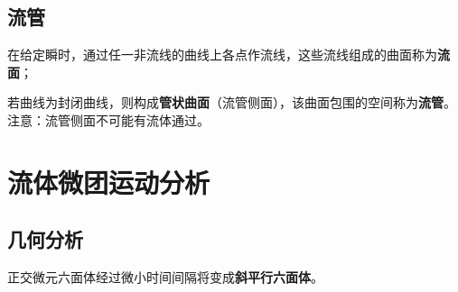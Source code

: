 \subsection{流管}

在给定瞬时，通过任一非流线的曲线上各点作流线，这些流线组成的曲面称为\textbf{流面}；

若曲线为封闭曲线，则构成\textbf{管状曲面}（流管侧面），该曲面包围的空间称为\textbf{流管}。注意：流管侧面不可能有流体通过。

\section{流体微团运动分析}

\subsection{几何分析}

正交微元六面体经过微小时间间隔将变成\textbf{斜平行六面体}。

